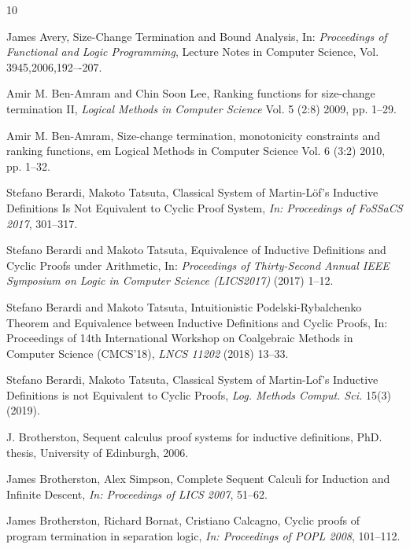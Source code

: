 
\begin{thebibliography}{10}


James Avery,
Size-Change Termination and Bound Analysis,
In: {\em Proceedings of Functional and Logic Programming}, Lecture Notes in Computer Science, Vol. 3945,2006,192–-207.

Amir M. Ben-Amram and Chin Soon Lee,
Ranking functions for size-change termination II,
{\em Logical Methods in Computer Science}
Vol. 5 (2:8) 2009, pp. 1–29.

Amir M. Ben-Amram,
Size-change termination, monotonicity constraints
and ranking functions,
{em Logical Methods in Computer Science}
Vol. 6 (3:2) 2010, pp. 1–32.

Stefano Berardi, Makoto Tatsuta,
Classical System of Martin-Löf's Inductive Definitions Is Not Equivalent to Cyclic Proof System,
{\em In: Proceedings of FoSSaCS 2017}, 301--317.

	Stefano Berardi and Makoto Tatsuta,
	Equivalence of Inductive Definitions and Cyclic Proofs under Arithmetic,
	In: {\em Proceedings of Thirty-Second Annual IEEE Symposium on 
	Logic in Computer Science (LICS2017)} (2017) 1--12.

	Stefano Berardi and Makoto Tatsuta,
	Intuitionistic Podelski-Rybalchenko Theorem and Equivalence between 
	Inductive Definitions and Cyclic Proofs,
	In: Proceedings of 14th International Workshop on Coalgebraic Methods 
	in Computer Science (CMCS'18), {\em LNCS 11202} (2018) 13--33.

Stefano Berardi, Makoto Tatsuta,
Classical System of Martin-Lof's Inductive Definitions is not Equivalent to Cyclic Proofs,
{\em Log. Methods Comput. Sci.} 15(3) (2019).

J. Brotherston,
Sequent calculus proof systems
for inductive definitions,
PhD. thesis, University of Edinburgh, 2006.

James Brotherston, Alex Simpson,
Complete Sequent Calculi for Induction and Infinite Descent,
{\em In: Proceedings of LICS 2007}, 51--62.

James Brotherston, Richard Bornat, Cristiano Calcagno,
Cyclic proofs of program termination in separation logic,
{\em In: Proceedings of POPL 2008}, 101--112.


\end{thebibliography}
